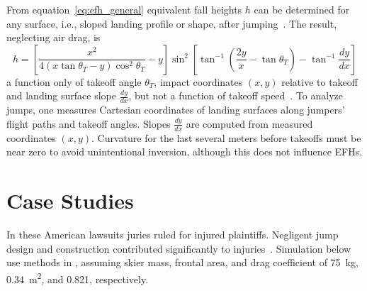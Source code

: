 \documentclass[smallextended]{svjour3}       %
\begin{document}
From equation~\ref{eq:efh_general} equivalent fall heights $h$ can be
determined for any surface, i.e., sloped landing profile or shape, after
jumping~\cite{Petrone2017}. The result, neglecting air drag, is
%
\begin{equation}
  h = \left[\frac{x^2}{4(x\tan\theta_T - y)\cos^{2}\theta_T} -
    y\right]\sin^{2}\left[\tan^{-1}\left(\frac{2y}{x}- \tan\theta_T\right) -
    \tan^{-1}\frac{dy}{dx}\right]
  \label{eq:efh}
\end{equation}
%
a function only of takeoff angle $\theta_T$,  impact coordinates $(x,y)$ relative 
to takeoff and landing surface slope $\frac{dy}{dx}$, but
not a function of takeoff speed~\cite{Petrone2017}. 
To analyze jumps, one measures Cartesian coordinates of landing surfaces along
jumpers' flight paths and takeoff angles. Slopes $\frac{dy}{dx}$ are computed
from measured coordinates $(x,y)$. Curvature for the last several meters before
takeoffs must be near zero to avoid unintentional inversion, although this does
not influence EFHs.

\section{Case Studies}
\label{sec:case}
%
In these American lawsuits juries ruled for injured plaintiffs. Negligent jump
design and construction contributed significantly to
injuries~\cite{SuperiorCourtSanFranciscoCounty2002,KingCountySuperiorCourt2008}.
Simulation below use methods in \cite{Levy2015}, assuming skier mass, frontal
area, and drag coefficient of 75~\si{\kg}, 0.34~\si{\meter\squared}, and 0.821,
respectively.
\end{document}
